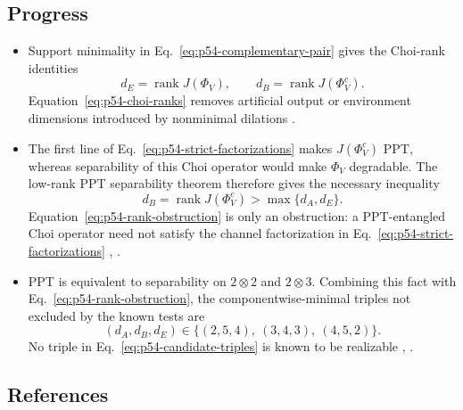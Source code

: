 \subsection*{Progress}

\begin{itemize}
  \item Support minimality in Eq.~\eqref{eq:p54-complementary-pair} gives the
  Choi-rank identities
  \begin{equation}
    d_E=\operatorname{rank}J(\Phi_V),
    \qquad
    d_B=\operatorname{rank}J(\Phi_V^c).
    \label{eq:p54-choi-ranks}
  \end{equation}
  Equation~\eqref{eq:p54-choi-ranks} removes artificial output or environment
  dimensions introduced by nonminimal dilations
  .

  \item The first line of Eq.~\eqref{eq:p54-strict-factorizations} makes
  $J(\Phi_V^c)$ PPT, whereas separability of this Choi operator would make
  $\Phi_V$ degradable.  The low-rank PPT separability theorem therefore gives
  the necessary inequality
  \begin{equation}
    d_B=\operatorname{rank}J(\Phi_V^c)
      >\max\{d_A,d_E\}.
    \label{eq:p54-rank-obstruction}
  \end{equation}
  Equation~\eqref{eq:p54-rank-obstruction} is only an obstruction: a
  PPT-entangled Choi operator need not satisfy the channel factorization in
  Eq.~\eqref{eq:p54-strict-factorizations}
  ,
  .

  \item PPT is equivalent to separability on $2\otimes2$ and $2\otimes3$.
  Combining this fact with Eq.~\eqref{eq:p54-rank-obstruction}, the
  componentwise-minimal triples not excluded by the known tests are
  \begin{equation}
    (d_A,d_B,d_E)\in
      \{(2,5,4),\ (3,4,3),\ (4,5,2)\}.
    \label{eq:p54-candidate-triples}
  \end{equation}
  No triple in Eq.~\eqref{eq:p54-candidate-triples} is known to be realizable
  ,
  .
\end{itemize}

\subsection*{References}

